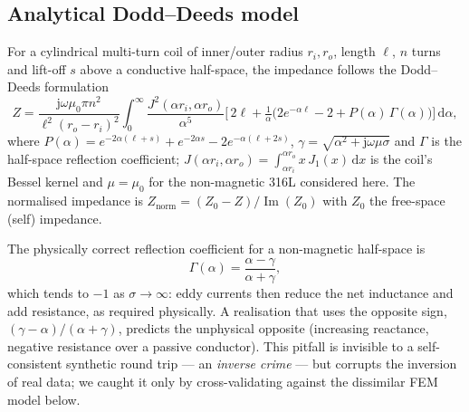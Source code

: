 \documentclass[11pt]{article}
\begin{document}
\subsection{Analytical Dodd--Deeds model}
For a cylindrical multi-turn coil of inner/outer radius $r_i,r_o$, length $\ell$,
$n$ turns and lift-off $s$ above a conductive half-space, the impedance follows
the Dodd--Deeds formulation \cite{dodd1968,bowler2019,theodoulidis2006}
\begin{equation}
  Z = \frac{\mathrm{j}\omega\mu_0\pi n^2}{\ell^2 (r_o-r_i)^2}
  \int_0^\infty \frac{J^2(\alpha r_i,\alpha r_o)}{\alpha^5}
  \Big[\,2\ell + \tfrac{1}{\alpha}\big(2e^{-\alpha\ell}-2 + P(\alpha)\,\Gamma(\alpha)\big)\Big]\,
  \mathrm{d}\alpha,
  \label{eq:dd}
\end{equation}
where $P(\alpha)=e^{-2\alpha(\ell+s)}+e^{-2\alpha s}-2e^{-\alpha(\ell+2s)}$,
$\gamma=\sqrt{\alpha^2+\mathrm{j}\omega\mu\sigma}$ and $\Gamma$ is the half-space
reflection coefficient; $J(\alpha r_i,\alpha r_o)=\int_{\alpha r_i}^{\alpha r_o}
x\,J_1(x)\,\mathrm{d}x$ is the coil's Bessel kernel and $\mu=\mu_0$ for the
non-magnetic 316L considered here. The normalised impedance is
$Z_{\mathrm{norm}}=(Z_0-Z)/\operatorname{Im}(Z_0)$ with $Z_0$ the free-space
(self) impedance.

The physically correct reflection coefficient for a non-magnetic half-space is
\begin{equation}
  \Gamma(\alpha)=\frac{\alpha-\gamma}{\alpha+\gamma},
  \label{eq:refl}
\end{equation}
which tends to $-1$ as $\sigma\to\infty$: eddy currents then reduce the net
inductance and add resistance, as required physically. A realisation that uses
the opposite sign, $(\gamma-\alpha)/(\alpha+\gamma)$, predicts the unphysical
opposite (increasing reactance, negative resistance over a passive conductor).
This pitfall is invisible to a self-consistent synthetic round trip --- an
\emph{inverse crime} --- but corrupts the inversion of real data; we caught it
only by cross-validating against the dissimilar FEM model below.
\end{document}
